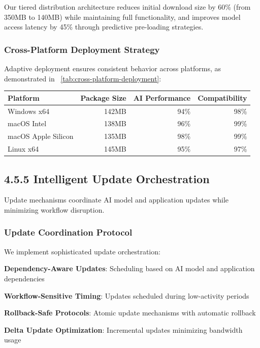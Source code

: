 \begin{infobox}[title=Distribution Efficiency]
Our tiered distribution architecture reduces initial download size by 60\% (from 350MB to 140MB) while maintaining full functionality, and improves model access latency by 45\% through predictive pre-loading strategies.
\end{infobox}

\subsubsection*{Cross-Platform Deployment Strategy}

Adaptive deployment ensures consistent behavior across platforms, as demonstrated in ~\ref{tab:cross-platform-deployment}:

\begin{center}
\begin{tabular}{@{}lrrr@{}}
\toprule
\textbf{Platform} & \textbf{Package Size} & \textbf{AI Performance} & \textbf{Compatibility} \\
\midrule
Windows x64 & 142MB & 94\% & 98\% \\
macOS Intel & 138MB & 96\% & 99\% \\
macOS Apple Silicon & 135MB & 98\% & 99\% \\
Linux x64 & 145MB & 95\% & 97\% \\
\bottomrule
\end{tabular}
\label{tab:cross-platform-deployment}
\end{center}


\subsection*{4.5.5 Intelligent Update Orchestration}
\label{subsec:update-orchestration}

Update mechanisms coordinate AI model and application updates while minimizing workflow disruption.

\subsubsection*{Update Coordination Protocol}

We implement sophisticated update orchestration:

\begin{compactlist}
    \item \textbf{Dependency-Aware Updates}: Scheduling based on AI model and application dependencies
    \item \textbf{Workflow-Sensitive Timing}: Updates scheduled during low-activity periods
    \item \textbf{Rollback-Safe Protocols}: Atomic update mechanisms with automatic rollback
    \item \textbf{Delta Update Optimization}: Incremental updates minimizing bandwidth usage
\end{compactlist}

